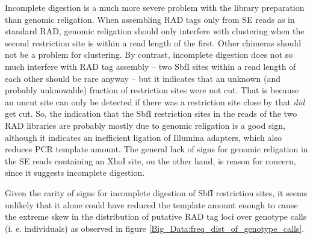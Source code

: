\documentclass[a4paper,12pt,times,print,index,custombib,custommargin]{PhDThesisPSnPDF}\usepackage[]{graphicx}\usepackage[]{color}
\begin{document}
Incomplete digestion is a much more severe problem with the library preparation than genomic religation. When assembling \glspl{RAD tag} only from SE reads as in standard RAD, genomic religation should only interfere with clustering when the second restriction site is within a read length of the first. Other chimeras should not be a problem for clustering. By contrast, incomplete digestion does not so much interfere with \gls{RAD tag} assembly -- two SbfI sites within a read length of each other should be rare anyway -- but it indicates that an unknown (and probably unknowable) fraction of restriction sites were not cut. That is because an uncut site can only be detected if there was a restriction site close by that \emph{did} get cut. So, the indication that the SbfI restriction sites in the reads of the two RAD libraries are probably mostly due to genomic religation is a good sign, although it indicates an inefficient ligation of Illumina adapters, which also reduces PCR template amount. The general lack of signs for genomic religation in the SE reads containing an XhoI site, on the other hand, is reason for concern, since it suggests incomplete digestion. 

Given the rarity of signs for incomplete digestion of SbfI restriction sites, it seems unlikely that it alone could have reduced the template amount enough to cause the extreme skew in the distribution of putative \gls{RAD tag} loci over genotype calls (i. e. individuals) as observed in figure \ref{Big_Data:freq_dist_of_genotype_calls}.

%
\end{document}
